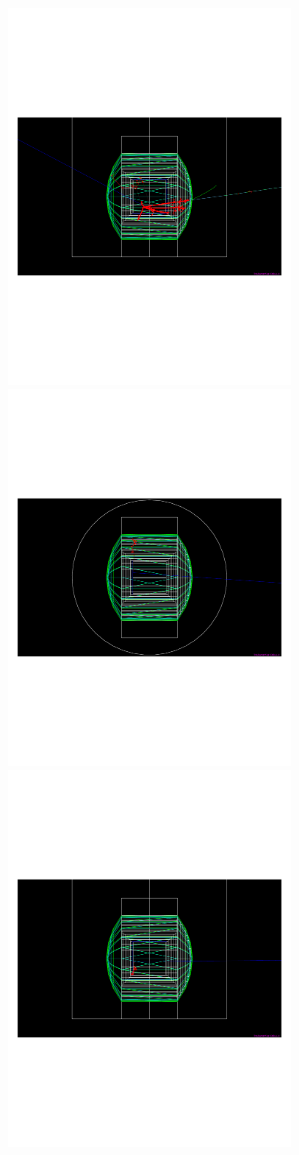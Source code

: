 \begin{figure}[htbp]
\begin{center}
  	\includegraphics[width=75mm]{Chapter4/figures/eventDisplay_event10_viewYZ.pdf}\\
	\vspace{3mm}
  	\includegraphics[width=75mm]{Chapter4/figures/eventDisplay_event5_viewXZ.pdf} 
  	\includegraphics[width=75mm]{Chapter4/figures/eventDisplay_event5_viewYZ.pdf} 

\end{center}
\end{figure}
